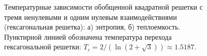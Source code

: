 \documentclass[utf8,12pt]{jetp}
\begin{document}
\begin{figure}[h]
	\begin{minipage}[h]{0.5\linewidth}
	\end{minipage}
	\hfill
	\begin{minipage}[h]{0.5\linewidth}
	\end{minipage}
	\caption{Температурные зависимости обобщенной квадратной решетки с тремя ненулевыми и одним нулевым взаимодействиями (гексагональная решетка): а) энтропия, б) теплоемкость. Пунктирной линией обозначена температура перехода гексагональной решетки: $T_c = 2/(\ln(2+\sqrt{3}))\approx 1.5187$.}
	\label{Hex}
\end{figure}
\end{document}

